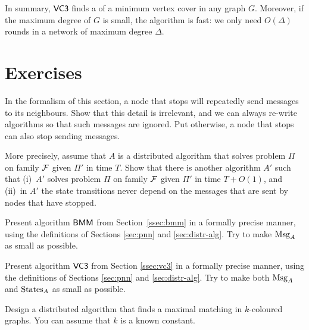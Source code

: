 In summary, $\textsf{VC3}$ finds a  of a minimum vertex cover in any graph $G$. Moreover, if the maximum degree of $G$ is small, the algorithm is fast: we only need $O(\Delta)$ rounds in a network of maximum degree $\Delta$.

\section{Exercises}

\begin{ex}
    In the formalism of this section, a node that stops will repeatedly send messages to its neighbours. Show that this detail is irrelevant, and we can always re-write algorithms so that such messages are ignored. Put otherwise, a node that stops can also stop sending messages.
    
    More precisely, assume that $A$ is a distributed algorithm that solves problem $\Pi$ on family $\mathcal{F}$ given $\Pi'$ in time $T$. Show that there is another algorithm $A'$ such that (i)~$A'$ solves problem $\Pi$ on family $\mathcal{F}$ given $\Pi'$ in time $T + O(1)$, and (ii)~in $A'$ the state transitions never depend on the messages that are sent by nodes that have stopped.
\end{ex}

\begin{ex}
    Present algorithm $\textsf{BMM}$ from Section~\ref{ssec:bmm} in a formally precise manner, using the definitions of Sections \ref{sec:pnn} and \ref{sec:distr-alg}. Try to make $\operatorname{Msg}_A$ as small as possible.
\end{ex}

\begin{ex}
    Present algorithm $\textsf{VC3}$ from Section \ref{ssec:vc3} in a formally precise manner, using the definitions of Sections \ref{sec:pnn} and \ref{sec:distr-alg}. Try to make both $\operatorname{Msg}_A$ and $\operatorname{States}_A$ as small as possible.
    
\end{ex}

\begin{ex}
    Design a distributed algorithm that finds a maximal matching in $k$-coloured graphs. You can assume that $k$ is a known constant.
\end{ex}

